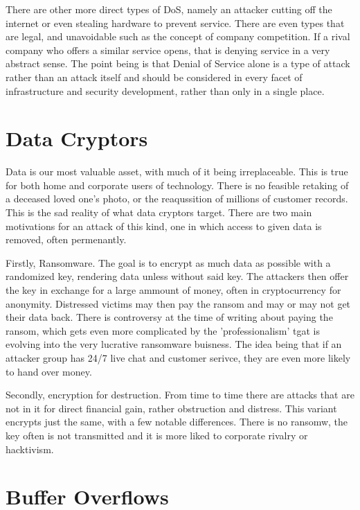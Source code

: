 There are other more direct types of DoS, namely an attacker cutting off the internet or even stealing hardware to prevent service. There are even types that are legal, and unavoidable such as the concept of company competition. If a rival company who offers a similar service opens, that is denying service in a very abstract sense.
The point being is that Denial of Service alone is a type of attack rather than an attack itself and should be considered in every facet of infrastructure and security development, rather than only in a single place.
\citep{AssignmentDOSPaper}


\section{Data Cryptors}
Data is our most valuable asset, with much of it being irreplaceable. This is true for both home and corporate users of technology. There is no feasible retaking of a deceased loved one's photo, or the reaqussition of millions of customer records. This is the sad reality of what data cryptors target.
There are two main motivations for an attack of this kind, one in which access to given data is removed, often permenantly. 

Firstly, Ransomware. The goal is to encrypt as much data as possible with a randomized key, rendering data unless without said key. The attackers then offer the key in exchange for a large ammount of money, often in cryptocurrency for anonymity. Distressed victims may then pay the ransom and may or may not get their data back.
There is controversy at the time of writing about paying the ransom, which gets even more complicated by the 'professionalism' tgat is evolving into the very lucrative ransomware buisness. The idea being that if an attacker group has 24/7 live chat and customer serivce, they are even more likely to hand over money.

Secondly, encryption for destruction. From time to time there are attacks that are not in it for direct financial gain, rather obstruction and distress. This variant encrypts just the same, with a few notable differences. There is no ransomw, the key often is not transmitted and it is more liked to corporate rivalry or hacktivism.


\section{Buffer Overflows}

